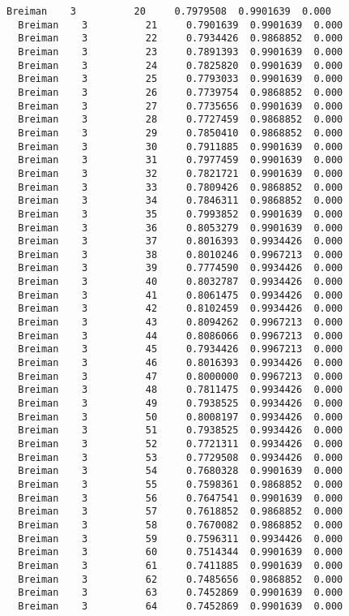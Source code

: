 \documentclass[11pt]{article}
\begin{document}
\begin{Verbatim}[commandchars=\\\{\}]
  Breiman    3          20     0.7979508  0.9901639  0.000
  Breiman    3          21     0.7901639  0.9901639  0.000
  Breiman    3          22     0.7934426  0.9868852  0.000
  Breiman    3          23     0.7891393  0.9901639  0.000
  Breiman    3          24     0.7825820  0.9901639  0.000
  Breiman    3          25     0.7793033  0.9901639  0.000
  Breiman    3          26     0.7739754  0.9868852  0.000
  Breiman    3          27     0.7735656  0.9901639  0.000
  Breiman    3          28     0.7727459  0.9868852  0.000
  Breiman    3          29     0.7850410  0.9868852  0.000
  Breiman    3          30     0.7911885  0.9901639  0.000
  Breiman    3          31     0.7977459  0.9901639  0.000
  Breiman    3          32     0.7821721  0.9901639  0.000
  Breiman    3          33     0.7809426  0.9868852  0.000
  Breiman    3          34     0.7846311  0.9868852  0.000
  Breiman    3          35     0.7993852  0.9901639  0.000
  Breiman    3          36     0.8053279  0.9901639  0.000
  Breiman    3          37     0.8016393  0.9934426  0.000
  Breiman    3          38     0.8010246  0.9967213  0.000
  Breiman    3          39     0.7774590  0.9934426  0.000
  Breiman    3          40     0.8032787  0.9934426  0.000
  Breiman    3          41     0.8061475  0.9934426  0.000
  Breiman    3          42     0.8102459  0.9934426  0.000
  Breiman    3          43     0.8094262  0.9967213  0.000
  Breiman    3          44     0.8086066  0.9967213  0.000
  Breiman    3          45     0.7934426  0.9967213  0.000
  Breiman    3          46     0.8016393  0.9934426  0.000
  Breiman    3          47     0.8000000  0.9967213  0.000
  Breiman    3          48     0.7811475  0.9934426  0.000
  Breiman    3          49     0.7938525  0.9934426  0.000
  Breiman    3          50     0.8008197  0.9934426  0.000
  Breiman    3          51     0.7938525  0.9934426  0.000
  Breiman    3          52     0.7721311  0.9934426  0.000
  Breiman    3          53     0.7729508  0.9934426  0.000
  Breiman    3          54     0.7680328  0.9901639  0.000
  Breiman    3          55     0.7598361  0.9868852  0.000
  Breiman    3          56     0.7647541  0.9901639  0.000
  Breiman    3          57     0.7618852  0.9868852  0.000
  Breiman    3          58     0.7670082  0.9868852  0.000
  Breiman    3          59     0.7596311  0.9934426  0.000
  Breiman    3          60     0.7514344  0.9901639  0.000
  Breiman    3          61     0.7411885  0.9901639  0.000
  Breiman    3          62     0.7485656  0.9868852  0.000
  Breiman    3          63     0.7452869  0.9901639  0.000
  Breiman    3          64     0.7452869  0.9901639  0.000

\end{Verbatim}
\end{document}
